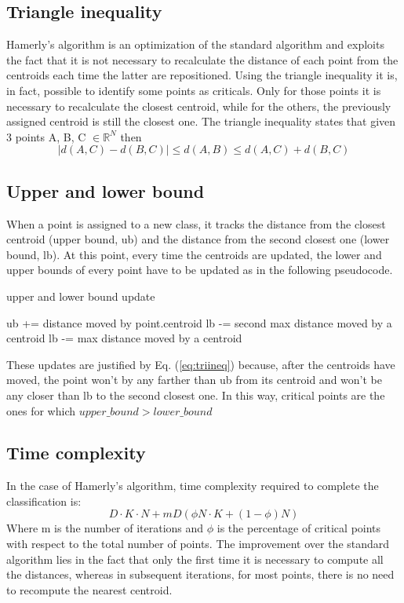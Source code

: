 \documentclass[conference]{IEEEtran}
\begin{document}
\subsection{Triangle inequality}
Hamerly's algorithm\cite{b1} is an optimization of the standard algorithm and exploits the fact that it is not necessary to recalculate the distance of each point from the centroids each time the latter are repositioned. Using the triangle inequality it is, in fact, possible to identify some points as criticals. Only for those points it is necessary to recalculate the closest centroid, while for the others, the previously assigned centroid is still the closest one.
The triangle inequality states that given 3 points A, B, C $\in \mathbb{R}^N$ then  
\begin{equation}
    \label{eq:triineq}
    |d(A, C) - d(B, C)| \leq d(A, B) \leq d(A, C) + d(B, C)
\end{equation}
    
\subsection{Upper and lower bound}
When a point is assigned to a new class, it tracks the distance from the closest centroid (upper bound, ub) and the distance from the second closest one (lower bound, lb). At this point, every time the centroids are updated, the lower and upper bounds of every point have to be updated as in the following pseudocode.

\begin{algorithm}[H]
    \caption{upper and lower bound update}
    \begin{algorithmic}
    \State ub += distance moved by point.centroid
        \State lb -= second max distance moved by a centroid
    \Else
        \State lb -= max distance moved by a centroid
    \EndIf
    \end{algorithmic}
\end{algorithm}

These updates are justified by Eq. (\ref{eq:triineq}) because, after the centroids have moved, the point won't by any farther than ub from its centroid and won't be any closer than lb to the second closest one. In this way, critical points are the ones for which $upper\_bound > lower\_bound$

\subsection{Time complexity}
In the case of Hamerly's algorithm, time complexity required to complete the classification is:
\begin{equation}
    D\cdot K\cdot N + mD(\phi N\cdot K + (1 - \phi)N)
    \label{eq:hamcomp}
\end{equation}
Where m is the number of iterations and $\phi$ is the percentage of critical points with respect to the total number of points.
The improvement over the standard algorithm lies in the fact that only the first time it is necessary to compute all the distances, whereas in subsequent iterations, for most points, there is no need to recompute the nearest centroid.
\end{document}
